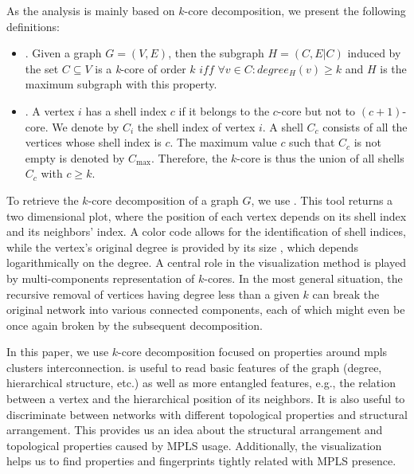 As the analysis is mainly based on $k$-core decomposition, we present the
following definitions:
\begin{itemize}
  \item{}. Given a graph $G=(V,E)$, then the
  subgraph $H=(C,E|C)$ induced by the set $ C\subseteq V$ is a \textit{k}-core
  of order $k$ $iff$ $\forall v \in C: degree_{H}(v)\geq k$ and $H$ is the
  maximum subgraph with this property.
  \item{}. A vertex $i$ has a shell index $c$ if it
  belongs to the $c$-core but not to $(c+1)$-core. We denote by $C_i$ the shell
  index of vertex $i$. A shell $C_c$ consists of all the vertices whose shell
  index is $c$. The maximum value $c$ such that $C_c$ is not empty is denoted by
  $C_{\max}$.  Therefore, the $k$-core is thus the union of all shells $C_c$ with
  $c \geq k$.
\end{itemize}

To retrieve the $k$-core decomposition of a graph $G$, we use
\lanet\cite{Alvarez06k}.  This tool returns a two dimensional plot,
where the position of each vertex depends on its shell index and its neighbors'
index. A color code allows for the identification of shell indices, while the
vertex's original degree is provided by its size , which depends logarithmically on the
degree. A central role in the visualization method is played by multi-components
representation of $k$-cores.   In the
most general situation, the recursive removal of vertices having degree less
than a given $k$ can break the original network into various connected
components, each of which might even be once again broken by the subsequent
decomposition.

In this paper, we use $k$-core decomposition focused on properties around mpls
clusters interconnection.  \lanet is useful to read basic features of the graph
(degree, hierarchical structure, etc.) as well as more entangled features, e.g.,
the relation between a vertex and the hierarchical position of its neighbors. It
is also useful to  discriminate between networks with different topological
properties and structural arrangement. This provides us an idea about the
structural arrangement and topological properties caused by MPLS usage.
Additionally, the visualization helps us to find properties and fingerprints
tightly related with MPLS presence.

